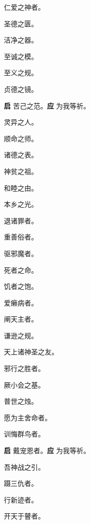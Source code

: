 \documentclass[UTF8,17pt]{ctexart}
\begin{document}
 仁爱之神者。

 圣德之匮。

 洁净之器。

 ⾄诚之模。

 ⾄义之规。

 贞德之镜。

\textbf{启} \quad 苦⼰之范。\hfill \textbf{应} \quad 为我等祈。

 灵异之⼈。

 顺命之师。

 诸德之表。

 神贫之祖。

 和睦之由。

 本乡之光。

 退诸罪者。

 重善俗者。

 驱邪魔者。

 死者之命。

 饥者之饱。

 爱癞病者。

 阐天主者。

 谦逊之规。

 天上诸神圣之友。

 邪⾏之胜者。

 厥⼩会之基。

 普世之烛。

 愿为主舍命者。

 训悔群鸟者。

\textbf{启} \quad 戴宠恩者。\hfill \textbf{应} \quad 为我等祈。

 吾神战之引。

 蹑三仇者。

 ⾏新迹者。

 开天于瞽者。
\end{document}
